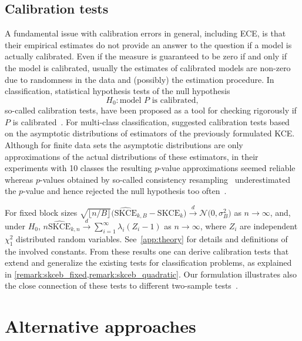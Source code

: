 \documentclass{article}
\begin{document}
\subsection{Calibration tests}

A fundamental issue with calibration errors in general, including ECE,
is that their empirical estimates do not provide an answer to the
question if a model is actually calibrated. Even if the measure is
guaranteed to be zero if and only if the model is calibrated,
usually the estimates of calibrated models are non-zero due to
randomness in the data and (possibly) the estimation procedure.
In classification, statistical hypothesis tests of the null hypothesis
\begin{equation*}
    H_0 \colon \text{model } P \text{ is calibrated},
\end{equation*}
so-called calibration tests, have been proposed as a tool for checking
rigorously if $P$ is calibrated~\citep{Broecker2007,Vaicenavicius2019,Widmann2019}.
For multi-class classification, \citet{Widmann2019} suggested 
calibration tests based on the asymptotic distributions of estimators
of the previously formulated KCE. Although for finite data sets the
asymptotic distributions are only approximations of the actual
distributions of these estimators, in their experiments with 10
classes the resulting $p$-value approximations seemed reliable whereas
$p$-values obtained by so-called consistency
resampling~\citep{Broecker2007,Vaicenavicius2019} underestimated
the $p$-value and hence rejected the null hypothesis too
often~\citep{Widmann2019}.

For fixed block sizes
$    \sqrt{\lfloor n / B \rfloor} \big(\widehat{\mathrm{SKCE}}_{k,B} - \mathrm{SKCE}_k\big) \xrightarrow{d} \mathcal{N}\big(0, \sigma^2_B\big)$ as $n \to \infty$,
and, under $H_0$,
$n \widehat{\mathrm{SKCE}}_{k,n} \xrightarrow{d} \sum_{i=1}^\infty \lambda_i (Z_i - 1)$ as $n \to \infty$,
where $Z_i$ are independent $\chi_1^2$ distributed random variables. See~\cref{app:theory} for details and definitions of the involved constants.
From these results one can derive
calibration tests that extend and generalize the existing tests
for classification problems, as explained in
\cref{remark:skceb_fixed,remark:skceb_quadratic}.
Our formulation illustrates also the close connection of these tests
to different two-sample tests~\citep{Gretton2007,Zaremba2013}.

\section{Alternative approaches}
\end{document}
